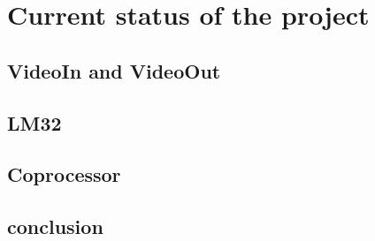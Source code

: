 

\section{Current status of the project}

\subsection{VideoIn and VideoOut}

\subsection{LM32}

\subsection{Coprocessor}

\subsection{conclusion}
